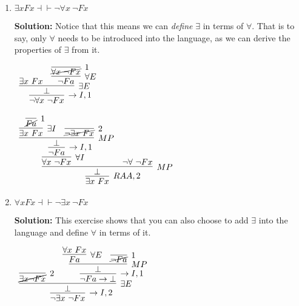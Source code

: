 \documentclass[11pt]{report}
\begin{document}
\begin{enumerate}
\begin{enumerate}
			\newpage
			\item $\exists x Fx \dashv\vdash \lnot \forall x \ \lnot Fx$
			
				{\bf Solution:} Notice that this means we can \emph{define} $\exists$ in terms of $\forall$. That is to say, only $\forall$ needs to be introduced into the language, as we can derive the properties of $\exists$ from it.

						\begin{mdframed}
							\begin{center}
								$\begin{array}{c}
									\infer[\to I,1]{\lnot \forall x \ \lnot Fx}
										{\infer[\exists E]{\bot}
											{\exists x \ Fx
											&
											\infer[\forall E]{\lnot Fa}
												{\infer[1]{\cancel{\forall x \ \lnot Fx}}{}}}}
								\end{array}$
							\end{center}
						\end{mdframed}

						\begin{mdframed}
							\begin{center}
								$\begin{array}{c}
									\infer[RAA,2]{\exists x \ Fx}
										{\infer[MP]{\bot}
											{\infer[\forall I]{\forall x \ \lnot Fx}
												{\infer[\to I,1]{\lnot Fa}
													{\infer[MP]{\bot}
														{\infer[\exists I]{\exists x \ Fx}
															{\infer[1]{\cancel{Fa}}{}}
														&
														\infer[2]{\cancel{\lnot \exists x \ Fx}}{}}}}
											&
											\lnot \forall \ \lnot F x}}
								\end{array}$
							\end{center}
						\end{mdframed}

			\item $\forall x Fx \dashv\vdash \lnot \exists x \ \lnot Fx$
			
				{\bf Solution:} This exercise shows that you can also choose to add $\exists$ into the language and define $\forall$ in terms of it. 

						\begin{mdframed}
							\begin{center}
								$\begin{array}{c}
									\infer[\to I,2]{\lnot\exists x \ \lnot Fx}
										{\infer[\exists E]{\bot}
											{\infer[2]{\cancel{\exists x \lnot Fx}}{}
											&
											\infer[\to I,1]{\lnot Fa \to \bot}
												{\infer[MP]{\bot}
													{\infer[\forall E]{Fa}{\forall x \ Fx}
													&
													\infer[1]{\cancel{\lnot Fa}}{}}}}}
								\end{array}$
							\end{center}
						\end{mdframed}


\end{enumerate}
\end{enumerate}
\end{document}
